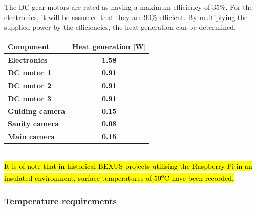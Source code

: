 {The DC gear motors are rated as having a maximum efficiency of 35\%. For the electronics, it will be assumed that they are 90\% efficient. By multiplying the supplied power by the efficiencies, the heat generation can be determined. \\

\begin{center}
  \begin{tabular}{ | l | c | }
    \hline
    \textbf{Component} & \textbf{Heat generation [W]}\\ 
    \hline
    \textbf{Electronics}  & \textbf{1.58} \\ 
    \hline
    \textbf{DC motor 1}  & \textbf{0.91} \\
    \hline
    \textbf{DC motor 2}  & \textbf{0.91} \\ 
    \hline
    \textbf{DC motor 3}  & \textbf{0.91} \\
    \hline
    \textbf{Guiding camera}  & \textbf{0.15} \\
    \hline
    \textbf{Sanity camera}  & \textbf{0.08} \\ 
    \hline
    \textbf{Main camera}  & \textbf{0.15}\\ 
    \hline
  \end{tabular}
\end{center}\\

\hl{It is of note that in historical BEXUS projects utilising the Raspberry Pi in an insulated environment, surface temperatures of 50\textsuperscript{o}C have been recorded.} \\}


\subsubsection{Temperature requirements}

